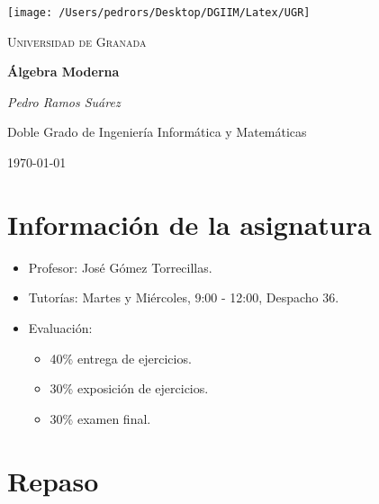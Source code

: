 \documentclass[11pt,a4paper]{article}
\theoremstyle{break}
\begin{document}
\begin{titlepage}
\centering
\texttt{[image: /Users/pedrors/Desktop/DGIIM/Latex/UGR]}\par\vspace{1cm}
{\scshape\LARGE Universidad de Granada \par}
\vspace{1cm}
\vspace{1.5cm}
{\huge\bfseries Álgebra Moderna\par}
\vspace{2cm}
{\Large\itshape Pedro Ramos Suárez\par}
\vfill
Doble Grado de Ingeniería Informática y Matemáticas
\vfill
{\large \today\par}
\end{titlepage}

\tableofcontents

\newpage

\section{Información de la asignatura}

\begin{itemize}
\item Profesor: José Gómez Torrecillas.
\item Tutorías: Martes y Miércoles, 9:00 - 12:00, Despacho 36.
\item Evaluación:
\begin{itemize}
\item 40\% entrega de ejercicios.
\item 30\% exposición de ejercicios.
\item 30\% examen final.
\end{itemize}
\end{itemize}

\newpage

\section{Repaso}
\end{document}
